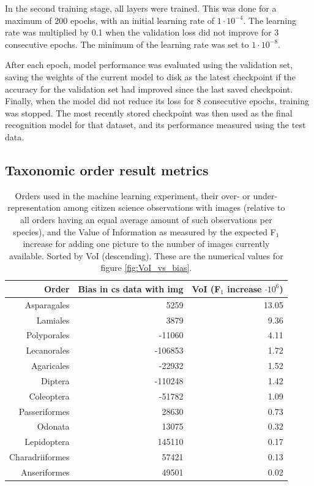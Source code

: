 \documentclass{article}
\begin{document}
In the second training stage, all layers were trained. This was done for a maximum of 200 epochs, with an initial learning rate of \(1\cdot10^{-4}\). The learning rate was multiplied by 0.1 when the validation loss did not improve for 3 consecutive epochs. The minimum of the learning rate was set to \(1\cdot10^{-8}\).

After each epoch, model performance was evaluated using the validation set, saving the weights of the current model to disk as the latest checkpoint if the accuracy for the validation set had improved since the last saved checkpoint. Finally, when the model did not reduce its loss for 8 consecutive epochs, training was stopped. The most recently stored checkpoint was then used as the final recognition model for that dataset, and its performance measured using the test data.


\pagebreak
\subsection*{Taxonomic order result metrics}


\begin{table}[h!]
  \centering

  \begin{tabular}{|r | r | r|} 
   \hline
   \textbf{Order} & \textbf{Bias in cs data with img} & \textbf{VoI (F\boldmath$_1$ increase \boldmath$\cdot10^{6}$)} \\ [0.5ex] 
   \hline
   Asparagales & 5259 & 13.05 \\
   Lamiales & 3879 & 9.36 \\
   Polyporales & -11060 & 4.11 \\
   Lecanorales & -106853 & 1.72 \\
   Agaricales & -22932 & 1.52 \\
   Diptera & -110248 & 1.42 \\
   Coleoptera & -51782 & 1.09 \\
   Passeriformes & 28630 & 0.73 \\
   Odonata & 13075 & 0.32 \\
   Lepidoptera & 145110 & 0.17 \\
   Charadriiformes & 57421 & 0.13 \\
   Anseriformes & 49501 & 0.02 \\  [1ex] 
   \hline
  \end{tabular}
  \caption{\footnotesize Orders used in the machine learning experiment, their over- or under-representation among citizen science observations with images (relative to all orders having an equal average amount of such observations per species), and the Value of Information as measured by the expected F\(_1\) increase for adding one picture to the number of images currently available. Sorted by VoI (descending). These are the numerical values for figure \ref{fig:VoI_vs_bias}.}
  \label{tab:biases}
  \end{table}
\end{document}
